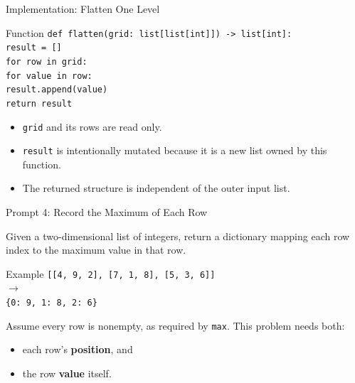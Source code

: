 \documentclass[aspectratio=169,10pt]{beamer}
\begin{document}
\begin{frame}{Implementation: Flatten One Level}
  \begin{block}{Function}
    \texttt{def flatten(grid: list[list[int]]) -> list[int]:}\\
    \hspace*{0.20in}\texttt{result = []}\\
    \hspace*{0.20in}\texttt{for row in grid:}\\
    \hspace*{0.40in}\texttt{for value in row:}\\
    \hspace*{0.60in}\texttt{result.append(value)}\\
    \hspace*{0.20in}\texttt{return result}
  \end{block}

  \begin{itemize}
    \item \texttt{grid} and its rows are read only.
    \item \texttt{result} is intentionally mutated because it is a new list owned by this function.
    \item The returned structure is independent of the outer input list.
  \end{itemize}
\end{frame}

\begin{frame}{Prompt 4: Record the Maximum of Each Row}
  \begin{activity}
    Given a two-dimensional list of integers, return a dictionary mapping each row index to the maximum value in that row.
  \end{activity}

  \begin{block}{Example}
    \texttt{[[4, 9, 2], [7, 1, 8], [5, 3, 6]]}\\
    $\longrightarrow$\\
    \texttt{\{0: 9, 1: 8, 2: 6\}}
  \end{block}

  Assume every row is nonempty, as required by \texttt{max}. This problem needs both:
  \begin{itemize}
    \item each row's \textbf{position}, and
    \item the row \textbf{value} itself.
  \end{itemize}
\end{frame}
\end{document}
